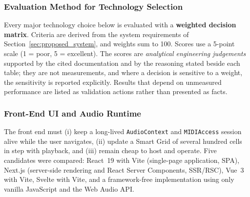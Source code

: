 \documentclass[a4paper]{article}
\begin{document}
\subsubsection{Evaluation Method for Technology Selection}

Every major technology choice below is evaluated with a \textbf{weighted decision matrix}. Criteria are derived from the system requirements of Section~\ref{sec:proposed_system}, and weights sum to 100. Scores use a 5-point scale (1 = poor, 5 = excellent). The scores are \emph{analytical engineering judgements} supported by the cited documentation and by the reasoning stated beside each table; they are not measurements, and where a decision is sensitive to a weight, the sensitivity is reported explicitly. Results that depend on unmeasured performance are listed as validation actions rather than presented as facts.

\subsubsection{Front-End UI and Audio Runtime}\label{sec:fe_eval}

The front end must (i) keep a long-lived \texttt{AudioContext} and \texttt{MIDIAccess} session alive while the user navigates, (ii) update a Smart Grid of several hundred cells in step with playback, and (iii) remain cheap to host and operate. Five candidates were compared: React~19 with Vite (single-page application, SPA), Next.js (server-side rendering and React Server Components, SSR/RSC), Vue~3 with Vite, Svelte with Vite, and a framework-free implementation using only vanilla JavaScript and the Web Audio API.
\end{document}
